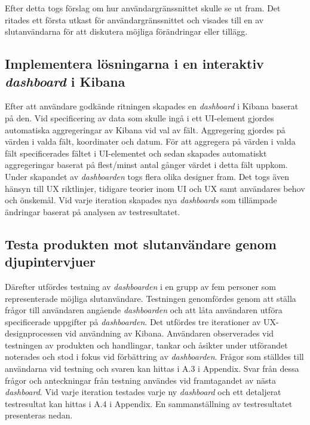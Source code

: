 \documentclass[12pt]{kththesis}
\begin{document}
Efter detta togs förslag om hur användargränssnittet skulle se ut fram. Det ritades ett första utkast för användargränssnittet och visades till en av slutanvändarna för att diskutera möjliga förändringar eller tillägg. 

\subsection{ Implementera lösningarna i en interaktiv \textit{dashboard} i Kibana }
Efter att användare godkände ritningen skapades en \textit{dashboard} i Kibana baserat på den. Vid specificering av data som skulle ingå i ett UI-element gjordes automatiska aggregeringar av Kibana vid val av fält. Aggregering gjordes på värden i valda fält, koordinater och datum. För att aggregera på värden i valda fält specificerades fältet i UI-elementet och sedan skapades automatiskt aggregeringar baserat på flest/minst antal gånger värdet i detta fält uppkom. Under skapandet av \textit{dashboarden} togs flera olika designer fram. Det togs även hänsyn till UX riktlinjer, tidigare teorier inom UI och UX samt användares behov och önskemål. Vid varje iteration skapades nya \textit{dashboards} som tillämpade ändringar baserat på analysen av testresultatet.

\subsection{ Testa produkten mot slutanvändare genom djupintervjuer 
}
Därefter utfördes testning av \textit{dashboarden} i en grupp av fem personer som representerade möjliga slutanvändare. Testningen genomfördes genom att ställa frågor till användaren angående \textit{dashboarden} och att låta användaren utföra specificerade uppgifter på \textit{dashboarden}. Det utfördes tre iterationer av UX-designprocessen vid användning av Kibana. Användaren observerades vid testningen av produkten och handlingar, tankar och åsikter under utförandet noterades och stod i fokus vid förbättring av \textit{dashboarden}. Frågor som ställdes till användarna vid testning och svaren kan hittas i A.3 i Appendix. Svar från dessa frågor och anteckningar från testning användes vid framtagandet av nästa \textit{dashboard}. Vid varje iteration testades varje ny \textit{dashboard} och ett detaljerat testresultat kan hittas i A.4 i Appendix. En sammanställning av testresultatet presenteras nedan. 
\end{document}
